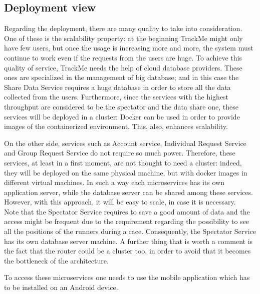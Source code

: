 \subsection{Deployment view}
\par
Regarding the deployment, there are many quality to take into consideration. One of these is the scalability property: at the beginning 
TrackMe might only have few users, but once the usage is increasing more and more, the system must continue to work even if the 
requests from the users are huge. To achieve this quality of service, TrackMe needs the help of cloud database providers. These ones 
are specialized in the management of big database; and in this case the Share Data Service requires a huge database in order to store 
all the data collected from the users. Furthermore, since the services with the highest throughput are considered to be the spectator and the
data share one, these services will be deployed in a cluster: Docker can be used in order to provide images of the containerized environment. 
This, also, enhances scalability. 
\par
On the other side, services such as Account service, Individual Request Service and Group Request Service do not require so much power. 
Therefore, these services, at least in a first moment, are not thought to need a cluster: indeed, they will be deployed on the same physical 
machine, but with docker images in different virtual machines. 
In such a way each microservices has its own application server, while the database server can be shared among these services. 
However, with this approach, it will be easy to scale, in case it is necessary. \\
Note that the Spectator Service requires to save a good amount of data and 
the access might be frequent due to the requirement regarding the possibility to see all the positions of the runners during a race. 
Consequently, the Spectator Service has its own database server machine.
A further thing that is worth a comment is the fact that the router could be a cluster too, in order to avoid that it becomes the bottleneck 
of the architecture. 
\par
To access these microservices one needs to use the mobile application which has to be installed on an Android device.

